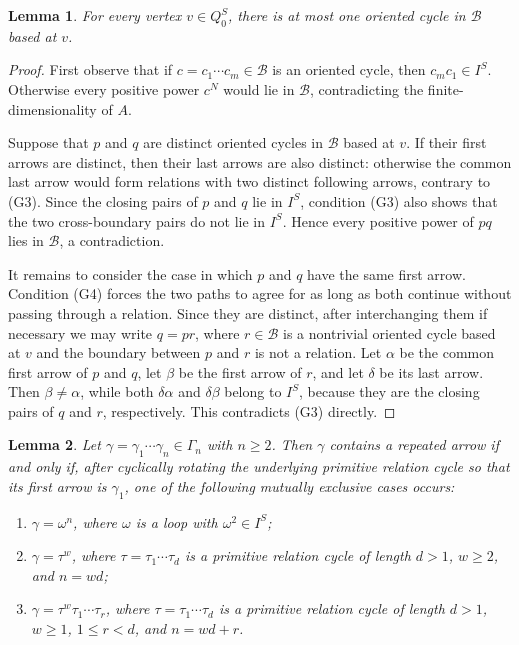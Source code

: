\documentclass[11pt,a4paper,reqno]{amsart}
\newcommand{\mB}{\mathcal B}
\theoremstyle{plain}
\newtheorem{lemma}[lemma]{Lemma}
\theoremstyle{definition}
\numberwithin{equation}{section}
\begin{document}
	\begin{lemma}
		\label{loop-cycle-unique}
		For every vertex $v\in Q_0^S$, there is at most one oriented cycle in $\mB$ based at $v$.
	\end{lemma}
	
	\begin{proof}
		First observe that if $c=c_1\cdots c_m\in\mB$ is an oriented cycle, then $c_m c_1\in I^S$. Otherwise every positive power $c^N$ would lie in $\mB$, contradicting the finite-dimensionality of $A$.
		
		Suppose that $p$ and $q$ are distinct oriented cycles in $\mB$ based at
		$v$. If their first arrows are distinct, then their last arrows are also
		distinct: otherwise the common last arrow would form relations with two
		distinct following arrows, contrary to \textup{(G3)}. Since the closing
		pairs of $p$ and $q$ lie in $I^S$, condition \textup{(G3)} also shows that
		the two cross-boundary pairs do not lie in $I^S$. Hence every positive power
		of $pq$ lies in $\mB$, a contradiction.
		
		It remains to consider the case in which $p$ and $q$ have the same first
		arrow. Condition \textup{(G4)} forces the two paths to agree for as long as
		both continue without passing through a relation. Since they are distinct,
		after interchanging them if necessary we may write $q=pr$, where $r\in\mB$
		is a nontrivial oriented cycle based at $v$ and the boundary between $p$ and
		$r$ is not a relation. Let $\alpha$ be the common first arrow of $p$ and
		$q$, let $\beta$ be the first arrow of $r$, and let $\delta$ be its last
		arrow. Then $\beta\neq\alpha$, while both $\delta\alpha$ and
		$\delta\beta$ belong to $I^S$, because they are the closing pairs of $q$
		and $r$, respectively. This contradicts \textup{(G3)} directly.
	\end{proof}
	
	\begin{lemma}\label{gamma-cases}
		Let $\gamma=\gamma_1\cdots\gamma_n\in\Gamma_n$ with $n\geq2$. Then $\gamma$ contains a repeated arrow if and only if, after cyclically rotating the underlying primitive relation cycle so that its first arrow is $\gamma_1$, one of the following mutually exclusive cases occurs:
		\begin{enumerate}[label=\textup{(\arabic*)}]
			\item $\gamma=\omega^n$, where $\omega$ is a loop with $\omega^2\in I^S$;
			\item $\gamma=\tau^w$, where $\tau=\tau_1\cdots\tau_d$ is a primitive relation cycle of length $d>1$, $w\geq2$, and $n=wd$;
			\item $\gamma=\tau^w\tau_1\cdots\tau_r$, where $\tau=\tau_1\cdots\tau_d$ is a primitive relation cycle of length $d>1$, $w\geq1$, $1\leq r<d$, and $n=wd+r$.
		\end{enumerate}
	\end{lemma}
	
\end{document}
